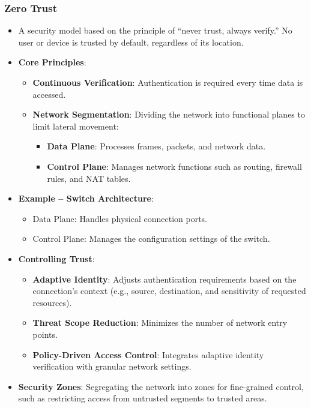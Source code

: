\documentclass[11pt]{article}
\begin{document}
\subsubsection{Zero Trust}
\label{sec:org092fa33}
\begin{itemize}
\item A security model based on the principle of ``never trust, always verify.''
No user or device is trusted by default, regardless of its location.
\item \textbf{Core Principles}:
\begin{itemize}
\item \textbf{\textbf{Continuous Verification}}: Authentication is required every time data is accessed.
\item \textbf{\textbf{Network Segmentation}}: Dividing the network into functional planes to limit lateral movement:
\begin{itemize}
\item \textbf{Data Plane}: Processes frames, packets, and network data.
\item \textbf{Control Plane}: Manages network functions such as routing, firewall rules, and NAT tables.
\end{itemize}
\end{itemize}
\item \textbf{Example – Switch Architecture}:
\begin{itemize}
\item Data Plane: Handles physical connection ports.
\item Control Plane: Manages the configuration settings of the switch.
\end{itemize}
\item \textbf{Controlling Trust}:
\begin{itemize}
\item \textbf{\textbf{Adaptive Identity}}: Adjusts authentication requirements based on the connection’s context (e.g., source, destination, and sensitivity of requested resources).
\item \textbf{\textbf{Threat Scope Reduction}}: Minimizes the number of network entry points.
\item \textbf{\textbf{Policy-Driven Access Control}}: Integrates adaptive identity verification with granular network settings.
\end{itemize}
\item \textbf{Security Zones}: Segregating the network into zones for fine-grained control, such as restricting access from untrusted segments to trusted areas.

\end{itemize}
\end{document}
